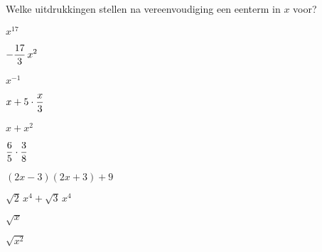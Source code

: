 \documentclass{ximera}
\begin{document}
	\author{Koen De Naeghel}
	\label{xim:veeltermen_basisbegrippen_oefeningen_reeks1}

\providecommand{\shortanswerscols}{1}
\renewcommand{\shortanswerscols}{3}

\begin{exercise}
	\begin{statement} Welke uitdrukkingen stellen na vereenvoudiging een eenterm in $x$ voor? \end{statement}


\begin{xmmulticols}
	\begin{question} \choiceYes  \( x^{17}                         \)   \end{question}
	\begin{question} \choiceYes  \( \displaystyle -\frac{17}{3}\,x^2          \)   \end{question}
	\begin{question} \choiceNo   \( x^{-1}                         \)   \end{question}
	\begin{question} \choiceYes  \( \displaystyle x + 5\cdot \frac{x}{3}      \)   \end{question}
	\begin{question} \choiceNo   \( x + x^2                        \)   \end{question}
	\begin{question} \choiceYes  \( \displaystyle \frac{6}{5}\cdot\frac{3}{8} \)   \end{question}
	\begin{question} \choiceYes  \( (2x-3)(2x+3)+9                 \)   \end{question}
	\begin{question} \choiceYes  \( \sqrt{2}\,x^4 + \sqrt{3}\,x^4  \)   \end{question}
	\begin{question} \choiceNo   \( \sqrt{x}                       \)   \end{question}
	\begin{question} \choiceNo   \( \sqrt{x^2}                     \)   \end{question}
\end{xmmulticols}
\end{exercise}
\end{document}
